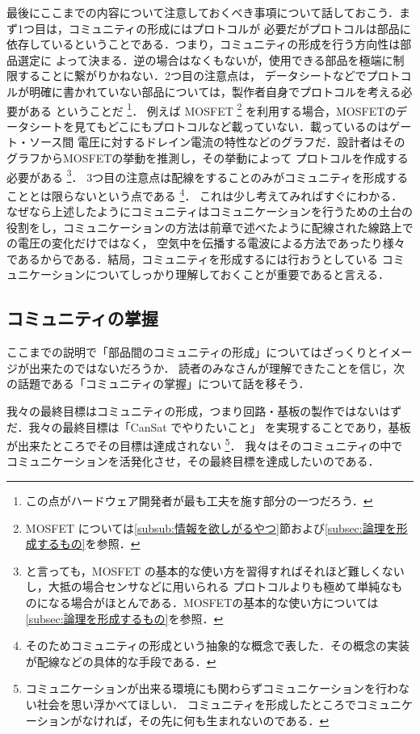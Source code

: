 \documentclass[dvipdfmx]{jsbook}
\begin{document}
  最後にここまでの内容について注意しておくべき事項について話しておこう．まず1つ目は，コミュニティの形成にはプロトコルが
  必要だがプロトコルは部品に依存しているということである．つまり，コミュニティの形成を行う方向性は部品選定に
  よって決まる．逆の場合はなくもないが，使用できる部品を極端に制限することに繋がりかねない．2つ目の注意点は，
  データシートなどでプロトコルが明確に書かれていない部品については，製作者自身でプロトコルを考える必要がある
  ということだ
  \footnote{この点がハードウェア開発者が最も工夫を施す部分の一つだろう．}．
  例えば MOSFET 
  \footnote{MOSFET については\ref{subsub:情報を欲しがるやつ}節および\ref{subsec:論理を形成するもの}を参照．}
  を利用する場合，MOSFETのデータシートを見てもどこにもプロトコルなど載っていない．載っているのはゲート・ソース間
  電圧に対するドレイン電流の特性などのグラフだ．設計者はそのグラフからMOSFETの挙動を推測し，その挙動によって
  プロトコルを作成する必要がある
  \footnote{と言っても，MOSFET の基本的な使い方を習得すればそれほど難しくないし，大抵の場合センサなどに用いられる
  プロトコルよりも極めて単純なものになる場合がほとんである．MOSFETの基本的な使い方については
  \ref{subsec:論理を形成するもの}を参照．}．
  3つ目の注意点は配線をすることのみがコミュニティを形成することとは限らないという点である
  \footnote{そのためコミュニティの形成という抽象的な概念で表した．その概念の実装が配線などの具体的な手段である．}．
  これは少し考えてみればすぐにわかる．なぜなら上述したようにコミュニティはコミュニケーションを行うための土台の
  役割をし，コミュニケーションの方法は前章で述べたように配線された線路上での電圧の変化だけではなく，
  空気中を伝播する電波による方法であったり様々であるからである．結局，コミュニティを形成するには行おうとしている
  コミュニケーションについてしっかり理解しておくことが重要であると言える．

\subsection{コミュニティの掌握}
  ここまでの説明で「部品間のコミュニティの形成」についてはざっくりとイメージが出来たのではないだろうか．
  読者のみなさんが理解できたことを信じ，次の話題である「コミュニティの掌握」について話を移そう．

  我々の最終目標はコミュニティの形成，つまり回路・基板の製作ではないはずだ．我々の最終目標は「CanSat でやりたいこと」
  を実現することであり，基板が出来たところでその目標は達成されない
  \footnote{コミュニケーションが出来る環境にも関わらずコミュニケーションを行わない社会を思い浮かべてほしい．
  コミュニティを形成したところでコミュニケーションがなければ，その先に何も生まれないのである．}．
  我々はそのコミュニティの中でコミュニケーションを活発化させ，その最終目標を達成したいのである．
  
\end{document}
